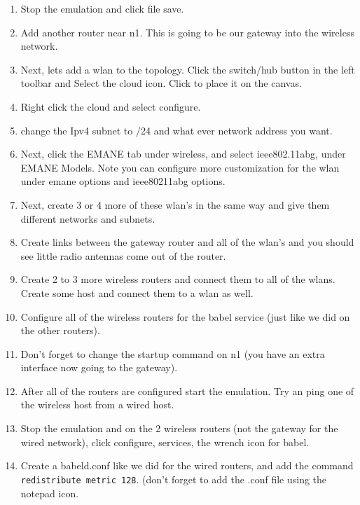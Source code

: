 \documentclass[main.tex]{subfiles}
\begin{document}
\begin{enumerate}[noitemsep,label=$\bullet$,leftmargin=20mm,labelsep=0.5cm]

\item Stop the emulation and click file save.

\item Add another router near n1.  This is going to be our gateway into the wireless network.

\item  Next, lets add a wlan to the topology.  Click the switch/hub button in the left toolbar and Select the cloud icon.  Click to place it on the canvas.

\item Right click the cloud and select configure.
\item change the Ipv4 subnet to /24 and what ever network address you want.
\item Next, click the EMANE tab under wireless, and select ieee802.11abg, under EMANE Models.  Note you can configure more customization for the wlan under emane options and ieee80211abg options.

\item Next, create 3 or 4 more of these wlan's in the same way and give them different networks and subnets.
\item Create links between the gateway router and all of the wlan's and you should see little radio antennas come out of the router.

\item Create 2 to 3 more wireless routers and connect them to all of the wlans.  Create some host and connect them to a wlan as well.

\item Configure all of the wireless routers for the babel service (just like we did on the other routers).
\item Don't forget to change the startup command on n1 (you have an extra interface now going to the gateway).


\item After all of the routers are configured start the emulation.  Try an ping one of the wireless host from a wired host.


\item Stop the emulation and on the 2 wireless routers (not the gateway for the wired network), click configure, services, the wrench icon for babel.
\item Create a babeld.conf like we did for the wired routers, and add the command \texttt{redistribute metric 128}. (don't forget to add the .conf file using the notepad icon.


\end{enumerate}
\end{document}
